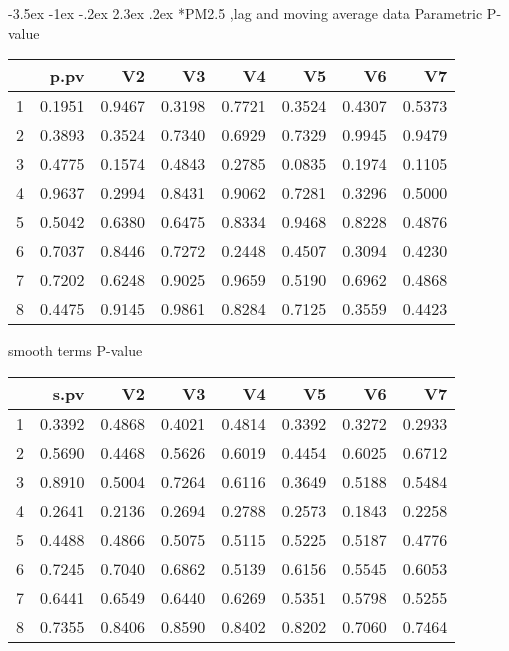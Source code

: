 \documentclass[a4paper, 12pt]{article}
\makeatletter
\def\Large{\fontsize{16}{24}\selectfont}
\renewcommand\section{\@startsection {section}{1}{\z@}%
                                   {-3.5ex \@plus -1ex \@minus -.2ex}%
                                   {2.3ex \@plus.2ex}%
                                   {\centering\normalfont\Large\bfseries}}
\makeatother
\begin{document}
\section*{PM2.5 ,lag and moving average data}
Parametric P-value
\begin{table}[ht]
\centering
\begin{tabular}{rrrrrrrr}
  \hline
 & p.pv & V2 & V3 & V4 & V5 & V6 & V7 \\
  \hline
1 & 0.1951 & 0.9467 & 0.3198 & 0.7721 & 0.3524 & 0.4307 & 0.5373 \\
  2 & 0.3893 & 0.3524 & 0.7340 & 0.6929 & 0.7329 & 0.9945 & 0.9479 \\
  3 & 0.4775 & 0.1574 & 0.4843 & 0.2785 & 0.0835 & 0.1974 & 0.1105 \\
  4 & 0.9637 & 0.2994 & 0.8431 & 0.9062 & 0.7281 & 0.3296 & 0.5000 \\
  5 & 0.5042 & 0.6380 & 0.6475 & 0.8334 & 0.9468 & 0.8228 & 0.4876 \\
  6 & 0.7037 & 0.8446 & 0.7272 & 0.2448 & 0.4507 & 0.3094 & 0.4230 \\
  7 & 0.7202 & 0.6248 & 0.9025 & 0.9659 & 0.5190 & 0.6962 & 0.4868 \\
  8 & 0.4475 & 0.9145 & 0.9861 & 0.8284 & 0.7125 & 0.3559 & 0.4423 \\
   \hline
\end{tabular}
\end{table}

smooth terms P-value
\begin{table}[ht]
\centering
\begin{tabular}{rrrrrrrr}
  \hline
 & s.pv & V2 & V3 & V4 & V5 & V6 & V7 \\
  \hline
1 & 0.3392 & 0.4868 & 0.4021 & 0.4814 & 0.3392 & 0.3272 & 0.2933 \\
  2 & 0.5690 & 0.4468 & 0.5626 & 0.6019 & 0.4454 & 0.6025 & 0.6712 \\
  3 & 0.8910 & 0.5004 & 0.7264 & 0.6116 & 0.3649 & 0.5188 & 0.5484 \\
  4 & 0.2641 & 0.2136 & 0.2694 & 0.2788 & 0.2573 & 0.1843 & 0.2258 \\
  5 & 0.4488 & 0.4866 & 0.5075 & 0.5115 & 0.5225 & 0.5187 & 0.4776 \\
  6 & 0.7245 & 0.7040 & 0.6862 & 0.5139 & 0.6156 & 0.5545 & 0.6053 \\
  7 & 0.6441 & 0.6549 & 0.6440 & 0.6269 & 0.5351 & 0.5798 & 0.5255 \\
  8 & 0.7355 & 0.8406 & 0.8590 & 0.8402 & 0.8202 & 0.7060 & 0.7464 \\
   \hline
\end{tabular}
\end{table}
\clearpage
\end{document}
